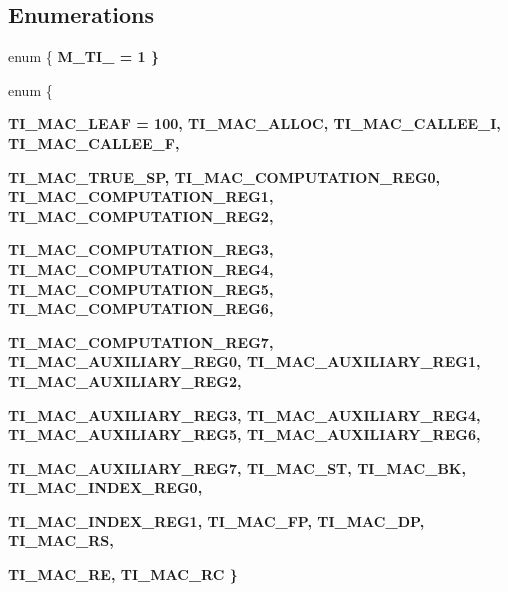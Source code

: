 \subsection*{Enumerations}
\begin{CompactItemize}
\item 
enum \{ \bf{M\_\-TI\_} =  1
 \}
\item 
enum \{ \par
\bf{TI\_\-MAC\_\-LEAF} =  100, 
\bf{TI\_\-MAC\_\-ALLOC}, 
\bf{TI\_\-MAC\_\-CALLEE\_\-I}, 
\bf{TI\_\-MAC\_\-CALLEE\_\-F}, 
\par
\bf{TI\_\-MAC\_\-TRUE\_\-SP}, 
\bf{TI\_\-MAC\_\-COMPUTATION\_\-REG0}, 
\bf{TI\_\-MAC\_\-COMPUTATION\_\-REG1}, 
\bf{TI\_\-MAC\_\-COMPUTATION\_\-REG2}, 
\par
\bf{TI\_\-MAC\_\-COMPUTATION\_\-REG3}, 
\bf{TI\_\-MAC\_\-COMPUTATION\_\-REG4}, 
\bf{TI\_\-MAC\_\-COMPUTATION\_\-REG5}, 
\bf{TI\_\-MAC\_\-COMPUTATION\_\-REG6}, 
\par
\bf{TI\_\-MAC\_\-COMPUTATION\_\-REG7}, 
\bf{TI\_\-MAC\_\-AUXILIARY\_\-REG0}, 
\bf{TI\_\-MAC\_\-AUXILIARY\_\-REG1}, 
\bf{TI\_\-MAC\_\-AUXILIARY\_\-REG2}, 
\par
\bf{TI\_\-MAC\_\-AUXILIARY\_\-REG3}, 
\bf{TI\_\-MAC\_\-AUXILIARY\_\-REG4}, 
\bf{TI\_\-MAC\_\-AUXILIARY\_\-REG5}, 
\bf{TI\_\-MAC\_\-AUXILIARY\_\-REG6}, 
\par
\bf{TI\_\-MAC\_\-AUXILIARY\_\-REG7}, 
\bf{TI\_\-MAC\_\-ST}, 
\bf{TI\_\-MAC\_\-BK}, 
\bf{TI\_\-MAC\_\-INDEX\_\-REG0}, 
\par
\bf{TI\_\-MAC\_\-INDEX\_\-REG1}, 
\bf{TI\_\-MAC\_\-FP}, 
\bf{TI\_\-MAC\_\-DP}, 
\bf{TI\_\-MAC\_\-RS}, 
\par
\bf{TI\_\-MAC\_\-RE}, 
\bf{TI\_\-MAC\_\-RC}
 \}
\end{CompactItemize}
